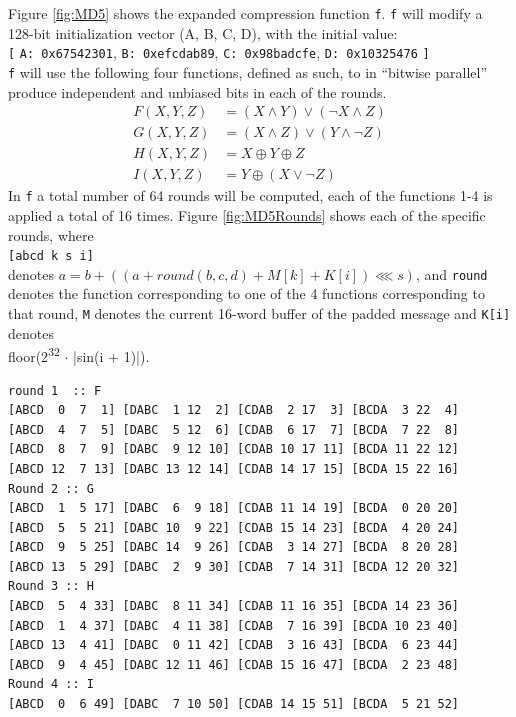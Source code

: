 \documentclass[a4paper, openany]{memoir}
\begin{document}
\begin{abstact}
Figure \ref{fig:MD5} shows the expanded compression function \texttt{f}. \texttt{f} will modify a 128-bit initialization vector (A, B, C, D), with the initial value:\\
\texttt{[} \texttt{A: 0x67542301}, \texttt{B: 0xefcdab89}, \texttt{C: 0x98badcfe}, \texttt{D: 0x10325476} \texttt{]}\\
\texttt{f} will use the following four functions, defined as such, to in ``bitwise parallel'' produce independent and unbiased bits in each of the rounds.
\begin{align}
F(X, Y, Z) &= (X \wedge Y) \vee (\neg X \wedge Z) \\
G(X, Y, Z) &= (X \wedge Z) \vee (Y \wedge \neg Z) \\
H(X, Y, Z) &= X \oplus Y \oplus Z \\
I(X, Y, Z) &= Y \oplus ( X \vee \neg Z)
\end{align}
In \texttt{f} a total number of 64 rounds will be computed, each of the functions 1-4 is applied a total of 16 times. Figure \ref{fig:MD5Rounds} shows each of the specific rounds, where\\
\texttt{[abcd k s i]}\\
denotes \(a = b + (( a + round(b,c,d) + M[k] + K[i]) \lll s)\), and \texttt{round} denotes the function corresponding to one of the 4 functions corresponding to that round, \texttt{M} denotes the current 16-word buffer of the padded message and \texttt{K[i]} denotes\\
floor(2\textsuperscript{32} \(\cdot\) |sin(i + 1)|).
\begin{table}[H]
\centering
\begin{BVerbatim}[fontsize=\tiny]
round 1  :: F
[ABCD  0  7  1] [DABC  1 12  2] [CDAB  2 17  3] [BCDA  3 22  4]
[ABCD  4  7  5] [DABC  5 12  6] [CDAB  6 17  7] [BCDA  7 22  8]
[ABCD  8  7  9] [DABC  9 12 10] [CDAB 10 17 11] [BCDA 11 22 12]
[ABCD 12  7 13] [DABC 13 12 14] [CDAB 14 17 15] [BCDA 15 22 16]
Round 2 :: G
[ABCD  1  5 17] [DABC  6  9 18] [CDAB 11 14 19] [BCDA  0 20 20]
[ABCD  5  5 21] [DABC 10  9 22] [CDAB 15 14 23] [BCDA  4 20 24]
[ABCD  9  5 25] [DABC 14  9 26] [CDAB  3 14 27] [BCDA  8 20 28]
[ABCD 13  5 29] [DABC  2  9 30] [CDAB  7 14 31] [BCDA 12 20 32]
Round 3 :: H
[ABCD  5  4 33] [DABC  8 11 34] [CDAB 11 16 35] [BCDA 14 23 36]
[ABCD  1  4 37] [DABC  4 11 38] [CDAB  7 16 39] [BCDA 10 23 40]
[ABCD 13  4 41] [DABC  0 11 42] [CDAB  3 16 43] [BCDA  6 23 44]
[ABCD  9  4 45] [DABC 12 11 46] [CDAB 15 16 47] [BCDA  2 23 48]
Round 4 :: I
[ABCD  0  6 49] [DABC  7 10 50] [CDAB 14 15 51] [BCDA  5 21 52]

\end{BVerbatim}
\end{table}
\end{abstact}
\end{document}
